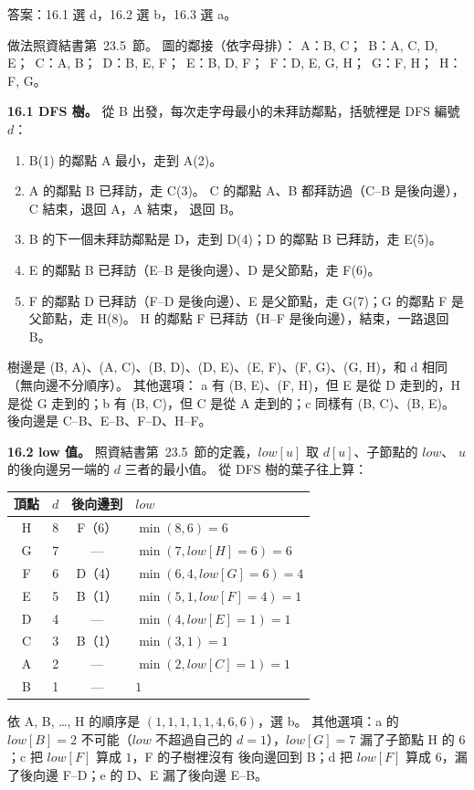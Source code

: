 \begin{pastsoln}
答案：16.1 選 d，16.2 選 b，16.3 選 a。

做法照資結書第~23.5~節。 圖的鄰接（依字母排）：
A：B, C；\ B：A, C, D, E；\ C：A, B；\ D：B, E, F；\ E：B, D, F；\ F：D, E, G, H；\ G：F, H；\ H：F, G。

\textbf{16.1 DFS 樹。} 從 B 出發，每次走字母最小的未拜訪鄰點，括號裡是 DFS 編號 $d$：
\begin{enumerate}
\item B(1) 的鄰點 A 最小，走到 A(2)。
\item A 的鄰點 B 已拜訪，走 C(3)。 C 的鄰點 A、B 都拜訪過（C--B 是後向邊），C 結束，退回 A，A 結束，
退回 B。
\item B 的下一個未拜訪鄰點是 D，走到 D(4)；D 的鄰點 B 已拜訪，走 E(5)。
\item E 的鄰點 B 已拜訪（E--B 是後向邊）、D 是父節點，走 F(6)。
\item F 的鄰點 D 已拜訪（F--D 是後向邊）、E 是父節點，走 G(7)；G 的鄰點 F 是父節點，走 H(8)。
H 的鄰點 F 已拜訪（H--F 是後向邊），結束，一路退回 B。
\end{enumerate}
樹邊是 (B, A)、(A, C)、(B, D)、(D, E)、(E, F)、(F, G)、(G, H)，和 d 相同（無向邊不分順序）。 其他選項：
a 有 (B, E)、(F, H)，但 E 是從 D 走到的，H 是從 G 走到的；b 有 (B, C)，但 C 是從 A 走到的；c 同樣有
(B, C)、(B, E)。 後向邊是 C--B、E--B、F--D、H--F。

\textbf{16.2 low 值。} 照資結書第~23.5~節的定義，$\mathit{low}[u]$ 取 $d[u]$、子節點的 $\mathit{low}$、
$u$ 的後向邊另一端的 $d$ 三者的最小值。 從 DFS 樹的葉子往上算：
\begin{center}
\begin{tabular}{cccl}
\toprule
頂點 & $d$ & 後向邊到 & $\mathit{low}$ \\
\midrule
H & 8 & F（6） & $\min(8, 6) = 6$ \\
G & 7 & --- & $\min(7, \mathit{low}[H] = 6) = 6$ \\
F & 6 & D（4） & $\min(6, 4, \mathit{low}[G] = 6) = 4$ \\
E & 5 & B（1） & $\min(5, 1, \mathit{low}[F] = 4) = 1$ \\
D & 4 & --- & $\min(4, \mathit{low}[E] = 1) = 1$ \\
C & 3 & B（1） & $\min(3, 1) = 1$ \\
A & 2 & --- & $\min(2, \mathit{low}[C] = 1) = 1$ \\
B & 1 & --- & $1$ \\
\bottomrule
\end{tabular}
\end{center}
依 A, B, \ldots, H 的順序是 $(1, 1, 1, 1, 1, 4, 6, 6)$，選 b。 其他選項：a 的 $\mathit{low}[B] = 2$ 不可能（$\mathit{low}$
不超過自己的 $d = 1$），$\mathit{low}[G] = 7$ 漏了子節點 H 的 $6$；c 把 $\mathit{low}[F]$ 算成 $1$，F 的子樹裡沒有
後向邊回到 B；d 把 $\mathit{low}[F]$ 算成 $6$，漏了後向邊 F--D；e 的 D、E 漏了後向邊 E--B。


\end{pastsoln}

